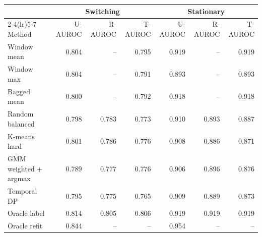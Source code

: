 \begin{tabular}{lrrrrrr}
\toprule
& \multicolumn{3}{c}{Switching} & \multicolumn{3}{c}{Stationary} \\
\cmidrule(lr){2-4}\cmidrule(lr){5-7}
Method & U-AUROC & R-AUROC & T-AUROC & U-AUROC & R-AUROC & T-AUROC \\
\midrule
Window mean & 0.804 & -- & 0.795 & 0.919 & -- & 0.919 \\
Window max & 0.804 & -- & 0.791 & 0.893 & -- & 0.893 \\
Bagged mean & 0.800 & -- & 0.792 & 0.918 & -- & 0.918 \\
Random balanced & 0.798 & 0.783 & 0.773 & 0.910 & 0.893 & 0.887 \\
K-means hard & 0.801 & 0.786 & 0.776 & 0.908 & 0.886 & 0.871 \\
GMM weighted + argmax & 0.789 & 0.777 & 0.776 & 0.906 & 0.896 & 0.876 \\
Temporal DP & 0.795 & 0.775 & 0.765 & 0.909 & 0.889 & 0.873 \\
Oracle label & 0.814 & 0.805 & 0.806 & 0.919 & 0.919 & 0.919 \\
Oracle refit & 0.844 & -- & -- & 0.954 & -- & -- \\
\bottomrule
\end{tabular}
